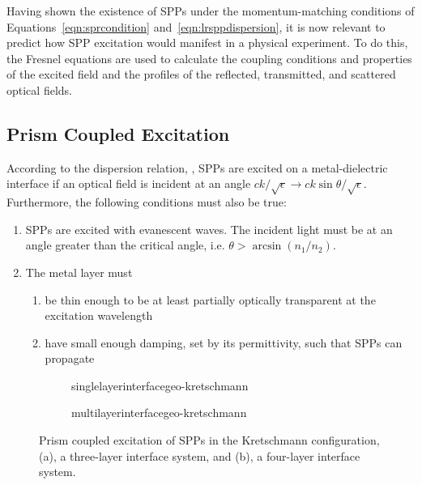 Having shown the existence of SPPs under the momentum-matching conditions
of Equations~\ref{eqn:sprcondition} and~\ref{eqn:lrsppdispersion}, it is
now relevant to predict how SPP excitation would manifest in a physical
experiment.  To do this, the Fresnel equations are used to calculate the
coupling conditions and properties of the excited field and the profiles of
the reflected, transmitted, and scattered optical fields.  

\subsection{Prism Coupled Excitation}
According to the dispersion relation, , SPPs are
excited on a metal-dielectric interface if an optical field is incident at
an angle $ck/\sqrt{\epsilon} \to ck\sin\theta/\sqrt{\epsilon}$.
Furthermore, the following conditions must also be true:
\begin{enumerate}
\item SPPs are excited with evanescent waves.  The
incident light must be at an angle greater than the critical angle, i.e.
$\theta>\arcsin\left(n_1/n_2\right)$.
\item The metal layer must
\begin{enumerate}
\item be thin enough to be at least partially optically transparent at the excitation wavelength
\item have small enough damping, set by its permittivity, such that SPPs can propagate
\end{enumerate}
\end{enumerate}

\begin{figure}[ht]
 \centering
 \begin{subfigure}[b]{0.4\textwidth}
  \centering
  {singlelayerinterfacegeo-kretschmann}
  \caption{}
 \end{subfigure}
 \begin{subfigure}[b]{0.4\textwidth}
  {multilayerinterfacegeo-kretschmann}
  \caption{}
 \end{subfigure}
\caption{Prism coupled excitation of SPPs in the Kretschmann configuration,
(a), a three-layer interface system, and (b), a four-layer interface system. }
\label{fig:prismcoupledsetups}
\end{figure}

